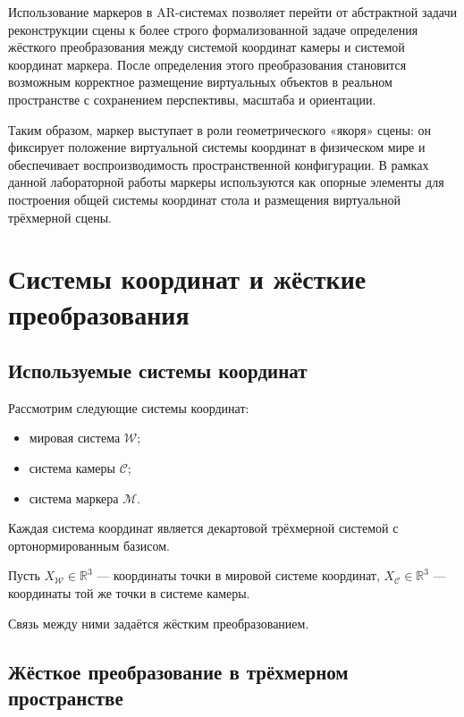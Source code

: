 \documentclass[a4paper,12pt]{article}
\begin{document}
Использование маркеров в AR-системах позволяет перейти от абстрактной задачи реконструкции сцены к более строго формализованной задаче определения жёсткого преобразования между системой координат камеры и системой координат маркера. После определения этого преобразования становится возможным корректное размещение виртуальных объектов в реальном пространстве с сохранением перспективы, масштаба и ориентации.

Таким образом, маркер выступает в роли геометрического «якоря» сцены: он фиксирует положение виртуальной системы координат в физическом мире и обеспечивает воспроизводимость пространственной конфигурации. В рамках данной лабораторной работы маркеры используются как опорные элементы для построения общей системы координат стола и размещения виртуальной трёхмерной сцены.



\section*{Системы координат и жёсткие преобразования}

\setcounter{equation}{0}

\subsection*{Используемые системы координат}

Рассмотрим следующие системы координат:

\begin{itemize}
    \item мировая система $\mathcal{W}$;
    \item система камеры $\mathcal{C}$;
    \item система маркера $\mathcal{M}$.
\end{itemize}

Каждая система координат является декартовой трёхмерной системой с ортонормированным базисом.

Пусть $X_{\mathcal{W}} \in \mathbb{R}^3$ --- координаты точки в мировой системе координат,  
$X_{\mathcal{C}} \in \mathbb{R}^3$ --- координаты той же точки в системе камеры.

Связь между ними задаётся жёстким преобразованием.

\subsection*{Жёсткое преобразование в трёхмерном пространстве}
\end{document}
